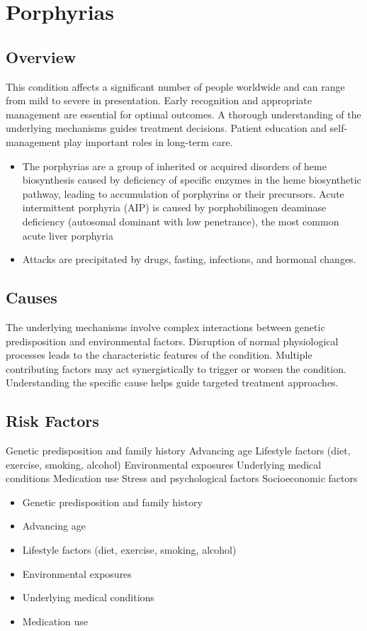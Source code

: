 \chapter{Porphyrias}
\label{sec:Porphyrias}

\section{Overview}
This condition affects a significant number of people worldwide and can range from mild to severe in presentation. Early recognition and appropriate management are essential for optimal outcomes. A thorough understanding of the underlying mechanisms guides treatment decisions. Patient education and self-management play important roles in long-term care.

\begin{itemize}[noitemsep]
  \item The porphyrias are a group of inherited or acquired disorders of heme biosynthesis caused by deficiency of specific enzymes in the heme biosynthetic pathway, leading to accumulation of porphyrins or their precursors. Acute intermittent porphyria (AIP) is caused by porphobilinogen deaminase deficiency (autosomal dominant with low penetrance), the most common acute liver porphyria
  \item Attacks are precipitated by drugs, fasting, infections, and hormonal changes.
\end{itemize}
\section{Causes}
The underlying mechanisms involve complex interactions between genetic predisposition and environmental factors. Disruption of normal physiological processes leads to the characteristic features of the condition. Multiple contributing factors may act synergistically to trigger or worsen the condition. Understanding the specific cause helps guide targeted treatment approaches.
\section{Risk Factors}
Genetic predisposition and family history Advancing age Lifestyle factors (diet, exercise, smoking, alcohol) Environmental exposures Underlying medical conditions Medication use Stress and psychological factors Socioeconomic factors

\begin{itemize}[noitemsep]
  \item Genetic predisposition and family history
  \item Advancing age
  \item Lifestyle factors (diet, exercise, smoking, alcohol)
  \item Environmental exposures
  \item Underlying medical conditions
  \item Medication use
\end{itemize}
